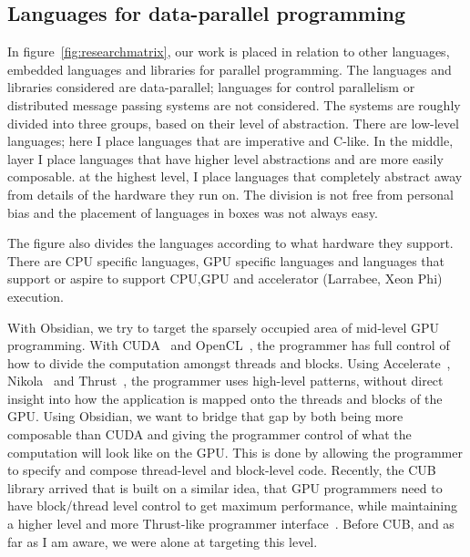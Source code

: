 \documentclass[a4paper]{book}
\begin{document}
\subsection{Languages for data-parallel programming}

In figure~\ref{fig:researchmatrix}, our work is placed in relation to other languages,
embedded languages and libraries for parallel programming. The languages and libraries considered 
are data-parallel; languages for control parallelism or distributed message passing systems are 
not considered. The systems are roughly divided 
into three groups, based on their level of abstraction. There are low-level languages; here 
I place languages that are imperative and C-like. In the middle, layer I place languages 
that have higher level abstractions and are more easily composable. 
at the highest level, I place languages that completely abstract away from details of the 
hardware they run on. The division is not free from personal bias and the placement of languages
in boxes was not always easy. 

The figure also divides the languages according to what hardware they support. There 
are CPU specific languages, GPU specific languages and languages that support or aspire 
to support CPU,GPU and accelerator (Larrabee, Xeon Phi) execution. 

With Obsidian, we try to target the sparsely occupied area of mid-level GPU programming. With 
CUDA~\citet{wwwcuda} and OpenCL~\citet{OpenCL}, the programmer has full control of how to divide 
the computation amongst threads and blocks. Using Accelerate~\citet{ACCELERATEDAMP11}, 
Nikola~\citet{NIKOLA} 
and Thrust~\citet{THRUST}, the programmer uses 
high-level patterns, without direct insight into how the application is mapped onto 
the threads and blocks of the GPU. Using Obsidian, we want to bridge that gap by both being 
more composable than CUDA and giving the programmer control of what the computation will 
look like on the GPU. This is done by allowing the programmer to specify and compose 
thread-level and block-level code. Recently, the CUB library arrived that is built on a 
similar idea, that GPU programmers need to have block/thread level control to get maximum 
performance, while maintaining a higher level and more Thrust-like programmer 
interface~\citet{CUB}. Before CUB, and as far as I am aware, we were alone at targeting 
this level.  
\end{document}
